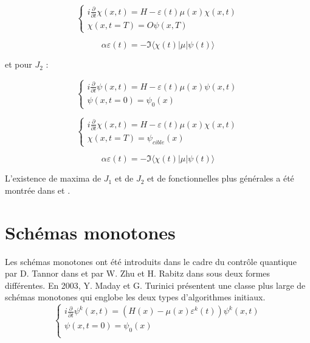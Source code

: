 \begin{equation}
\begin{cases}
i \frac{\partial}{\partial t} \chi (x,t) = H - \varepsilon(t)\mu(x)\chi(x,t)\\
\chi(x,t=T)=O\psi(x,T)
\end{cases}
\end{equation}

\begin{equation}
\alpha \varepsilon(t) = -\Im \langle \chi(t)|\mu|\psi(t)\rangle 
\end{equation}

et pour $J_2$ :

\begin{equation}
\begin{cases}
i \frac{\partial}{\partial t} \psi (x,t) = H - \varepsilon(t)\mu(x)\psi(x,t)\\
\psi(x,t=0)=\psi_0(x)
\end{cases}
\end{equation}

\begin{equation}
\begin{cases}
i \frac{\partial}{\partial t} \chi (x,t) = H - \varepsilon(t)\mu(x)\chi(x,t)\\
\chi(x,t=T)=\psi_{cible}(x)
\end{cases}
\end{equation}

\begin{equation}
\alpha \varepsilon(t) = -\Im \langle \chi(t)|\mu|\psi(t)\rangle 
\end{equation}

L'existence de maxima de $J_1$ et de $J_2$ et de fonctionnelles plus générales a été montrée dans \cite{Cances} et \cite{Baudouin}.

\section{Schémas monotones}
Les schémas monotones ont été introduits dans le cadre du contrôle quantique par D. Tannor dans \cite{Tannor} et par W. Zhu et H. Rabitz dans \cite{Zhu} sous deux formes différentes. En 2003, Y. Maday et G. Turinici \cite{Maday} présentent une classe plus large de schémas monotones qui englobe les deux types d’algorithmes initiaux.
\begin{equation} \label{maday1}
\begin{cases}
i \frac{\partial }{\partial t} \psi^k (x,t) = (H(x)-\mu(x)\varepsilon^k(t))\psi^k (x,t)\\
\psi (x,t=0) = \psi_0(x)\\
\end{cases}
\end{equation}

